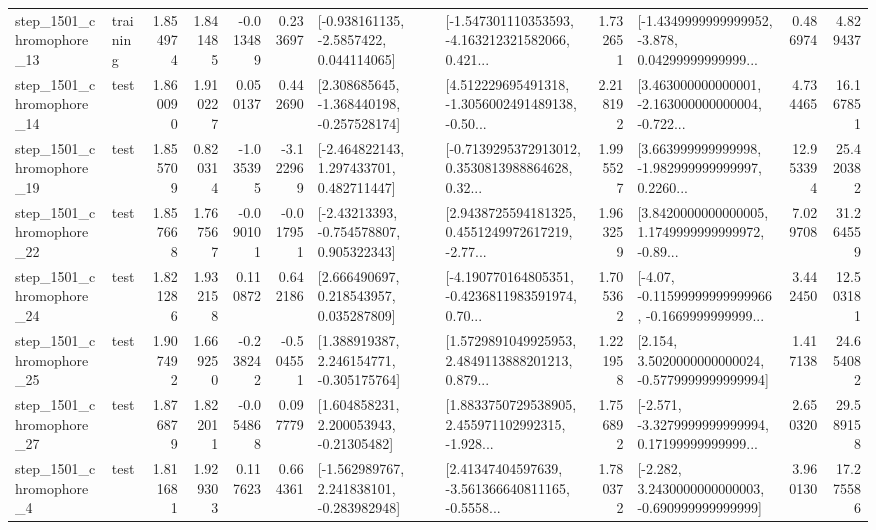 \begin{tabular}{llrrrrllrlrr}
 step\_1501\_chromophore\_13 &  training &      1.854974 &    1.841485 &     -0.013489 &  0.233697 &     [-0.938161135, -2.5857422, 0.044114065] &  [-1.547301110353593, -4.163212321582066, 0.421... &       1.732651 &  [-1.4349999999999952, -3.878, 0.04299999999999... &            0.486974 &          4.829437 \\
 step\_1501\_chromophore\_14 &      test &      1.860090 &    1.910227 &      0.050137 &  0.442690 &   [2.308685645, -1.368440198, -0.257528174] &  [4.512229695491318, -1.3056002491489138, -0.50... &       2.218192 &  [3.463000000000001, -2.163000000000004, -0.722... &            4.734465 &         16.167851 \\
 step\_1501\_chromophore\_19 &      test &      1.855709 &    0.820314 &     -1.035395 & -3.122969 &    [-2.464822143, 1.297433701, 0.482711447] &  [-0.7139295372913012, 0.3530813988864628, 0.32... &       1.995527 &  [3.663999999999998, -1.982999999999997, 0.2260... &           12.953394 &         25.420382 \\
 step\_1501\_chromophore\_22 &      test &      1.857668 &    1.767567 &     -0.090101 & -0.017951 &    [-2.43213393, -0.754578807, 0.905322343] &  [2.9438725594181325, 0.4551249972617219, -2.77... &       1.963259 &  [3.8420000000000005, 1.1749999999999972, -0.89... &            7.029708 &         31.264559 \\
 step\_1501\_chromophore\_24 &      test &      1.821286 &    1.932158 &      0.110872 &  0.642186 &     [2.666490697, 0.218543957, 0.035287809] &  [-4.190770164805351, -0.4236811983591974, 0.70... &       1.705362 &  [-4.07, -0.11599999999999966, -0.1669999999999... &            3.442450 &         12.503181 \\
 step\_1501\_chromophore\_25 &      test &      1.907492 &    1.669250 &     -0.238242 & -0.504551 &    [1.388919387, 2.246154771, -0.305175764] &  [1.5729891049925953, 2.4849113888201213, 0.879... &       1.221958 &   [2.154, 3.5020000000000024, -0.5779999999999994] &            1.417138 &         24.654082 \\
 step\_1501\_chromophore\_27 &      test &      1.876879 &    1.822011 &     -0.054868 &  0.097779 &     [1.604858231, 2.200053943, -0.21305482] &  [1.8833750729538905, 2.455971102992315, -1.928... &       1.756892 &  [-2.571, -3.3279999999999994, 0.17199999999999... &            2.650320 &         29.589158 \\
  step\_1501\_chromophore\_4 &      test &      1.811681 &    1.929303 &      0.117623 &  0.664361 &   [-1.562989767, 2.241838101, -0.283982948] &  [2.41347404597639, -3.561366640811165, -0.5558... &       1.780372 &   [-2.282, 3.2430000000000003, -0.690999999999999] &            3.960130 &         17.275586 \\

\end{tabular}
